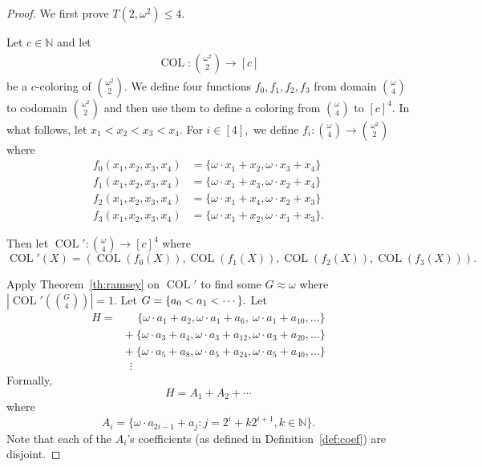 \documentclass[10pt,a4paper]{amsart}
\newcommand{\COL}{\operatorname{COL}}
\newcommand{\Commonconst}{A}
\newcommand{\N}{\mathbb{N}}
\newcommand{\commonconst}{a}
\newcommand{\numcolors}{c}
\newcommand{\oequiv}{\approx}
\newcommand{\om}{\omega}
\newcommand{\setconcat}{+}
\begin{document}
\begin{proof}
We first prove $T\left(2, \om^2\right) \leq 4$.

Let $\numcolors \in \N$ and let \begin{align*}
    \COL \colon \binom{\om^2}{2} \to [\numcolors]
\end{align*}
be a $\numcolors$-coloring of $\binom{\om^2}{2}$. 
We define four functions $f_0,f_1,f_2,f_3$ from 
domain $\binom{\om}{4}$ to codomain $\binom{\om^2}{2}$ and then use them to define a coloring 
from 
$\binom{\om}{4}$ to $[\numcolors]^4$.
In what follows, 
let $x_1<x_2<x_3<x_4$. For $i \in [4],$ we define $f_i \colon \binom{\om}{4} \to \binom{\om^2}{2}$ where \begin{align*}
f_0(x_1,x_2,x_3,x_4)  &= \{\om \cdot x_1 + x_2, \om \cdot x_3 + x_4\}\\
f_1(x_1,x_2,x_3,x_4)  &= \{\om \cdot x_1 + x_3, \om \cdot x_2 + x_4\}\\
f_2(x_1,x_2,x_3,x_4)  &= \{\om \cdot x_1 + x_4, \om \cdot x_2 + x_3\}\\
f_3(x_1,x_2,x_3,x_4)  &= \{\om \cdot x_1 + x_2, \om \cdot x_1 + x_3\}.
\end{align*}

Then let
$\COL' \colon \binom{\om}{4} \to [\numcolors]^4$ where
$$\COL'(X) =(\COL(f_0(X)),
\COL(f_1(X)),
\COL(f_2(X)),
\COL(f_3(X))
).
$$

Apply Theorem~\ref{th:ramsey} on $\COL'$ to find some $G \oequiv \omega$ where 
$\left|\COL' \left( \binom{G}{4} \right)\right|=1$.
Let $G = \{\commonconst_0 <\nobreak \commonconst_1 <\nobreak \cdots\}.$ Let
\begin{align*}
H = & ~~~~\!~\{\om \cdot \commonconst_{1} + \commonconst_2, \om \cdot \commonconst_{1} + \commonconst_6,~\om \cdot \commonconst_{1} + \commonconst_{10}, \ldots\} \\
 & \setconcat ~\{\om \cdot \commonconst_{3} + \commonconst_{4}, \om \cdot \commonconst_{3} + \commonconst_{12}, \om \cdot \commonconst_{3} + \commonconst_{20}, \ldots\}\\
 & \setconcat~\{\om \cdot \commonconst_{5} + \commonconst_{8}, \om \cdot \commonconst_{5} + \commonconst_{24}, \om \cdot \commonconst_{5} + \commonconst_{40}, \ldots\}\\
& ~~\!\vdots
\end{align*}
Formally, $$
H = \Commonconst_1 \setconcat \Commonconst_2 \setconcat \cdots
$$ where $$
\Commonconst_i = \{\om\cdot \commonconst_{2i-1} + \commonconst_j \colon j = 2^i + k 2^{i+1}, k \in \N\}.
$$
Note that each of the $A_i$'s coefficients
(as defined in Definition~\ref{def:coef}) 
are disjoint.


\end{proof}
\end{document}
